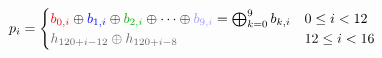 \documentclass{article}
\begin{document}
\vspace{8pt}
\begin{equation*}
	p_i = \begin{cases} 
	    \textcolor{red}{b_{0,i}} \oplus \textcolor{blue}{b_{1,i}} \oplus \textcolor{green!70!black}{b_{2,i}} \oplus \dots \oplus \textcolor{blue!40!white}{b_{9,i}} = \bigoplus_{k=0}^9 b_{k,i} & 0 \leq i < 12\\
	    \textcolor{white!40!black}{h_{120 + i - 12} \oplus h_{120 + i - 8}} & 12 \leq i < 16
	    \end{cases}
\end{equation*}


\vspace {8pt}

\def\palette{
    0/red/11111,1/blue/11110,2/green/11101,3/gray/11100,4/white/\vdots,5/orange/00011,6/yellow/00010,7/brown/00001,8/violet/00000}
\end{document}
